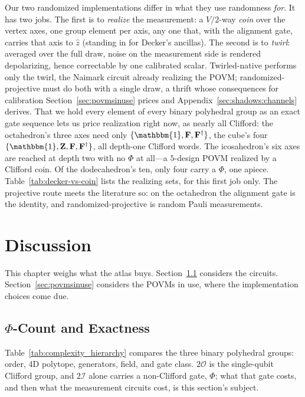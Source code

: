 \documentclass[11pt, oneside, openany]{scrbook}
\newcommand{\Id}{\mathbbm{1}}
\newcommand{\Ogroup}{\mathcal{O}}  %
\newcommand{\Igroup}{\mathcal{I}}  %
\newcommand{\TwoO}{2\Ogroup}
\newcommand{\TwoI}{2\Igroup}
\begin{document}
Our two randomized implementations differ in what they use randomness \textit{for}. It has two jobs. The first is to \textit{realize} the measurement: a $V/2$-way \textit{coin} over the vertex axes, one group element per axis, any one that, with the alignment gate, carries that axis to $\hat z$ (standing in for Decker's ancillas). The second is to \textit{twirl}: averaged over the full draw, noise on the measurement side is rendered depolarizing, hence correctable by one calibrated scalar. Twirled-native performs only the twirl, the Naimark circuit already realizing the POVM; randomized-projective must do both with a single draw, a thrift whose consequences for calibration Section~\ref{sec:povmsinuse} prices and Appendix~\ref{sec:shadows:channels} derives. That we hold every element of every binary polyhedral group as an exact gate sequence lets us price realization right now, as nearly all Clifford: the octahedron's three axes need only $\{\Id, \mathbf{F}, \mathbf{F}^\dagger\}$, the cube's four $\{\Id, \mathbf{Z}, \mathbf{F}, \mathbf{F}^\dagger\}$, all depth-one Clifford words. The icosahedron's six axes are reached at depth two with no $\Phi$ at all---a $5$-design POVM realized by a Clifford coin. Of the dodecahedron's ten, only four carry a $\Phi$, one apiece. Table~\ref{tab:decker-vs-coin} lists the realizing sets, for this first job only. The projective route meets the literature so: on the octahedron the alignment gate is the identity, and randomized-projective is random Pauli measurements.

\chapter{Discussion} \label{cha:discussion}


This chapter weighs what the atlas buys. Section~\ref{sec:magicfindings} considers the circuits. Section~\ref{sec:povmsinuse} considers the POVMs in use, where the implementation choices come due.

\section{\texorpdfstring{$\Phi$}{Φ}-Count and Exactness} \label{sec:magicfindings}

Table~\ref{tab:complexity_hierarchy} compares the three binary polyhedral groups: order, 4D polytope, generators, field, and gate class. $\TwoO$ is the single-qubit Clifford group, and $\TwoI$ alone carries a non-Clifford gate, $\Phi$; what that gate costs, and then what the measurement circuits cost, is this section's subject.
\end{document}
